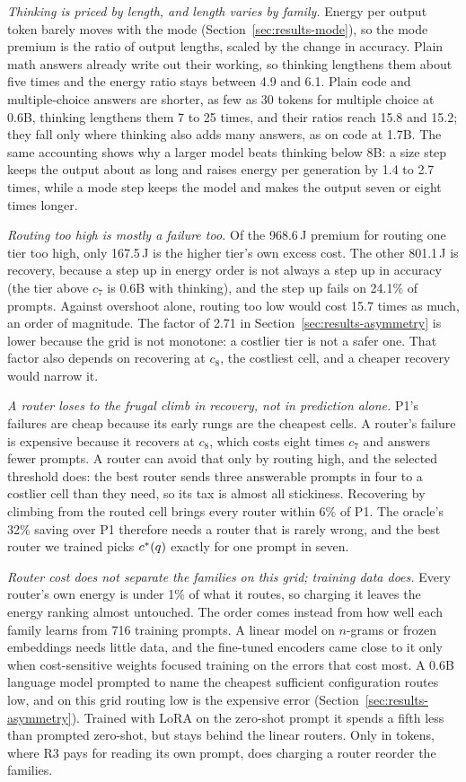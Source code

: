 \emph{Thinking is priced by length, and length varies by family.} Energy per
output token barely moves with the mode (Section~\ref{sec:results-mode}), so
the mode premium is the ratio of output lengths, scaled by the change in
accuracy. Plain math answers already write out their working, so thinking
lengthens them about five times and the energy ratio stays between 4.9 and
6.1. Plain code and multiple-choice answers are shorter, as few as 30 tokens
for multiple choice at 0.6B, thinking lengthens them 7 to 25 times, and
their ratios reach 15.8 and 15.2; they fall only where thinking also adds
many answers, as on code at 1.7B. The same accounting shows why a larger
model beats thinking below 8B: a size step keeps the output about as long
and raises energy per generation by 1.4 to 2.7 times, while a mode step
keeps the model and makes the output seven or eight times longer.

\emph{Routing too high is mostly a failure too.} Of the 968.6\,J premium
for routing one tier too high, only 167.5\,J is the higher tier's own excess
cost. The other 801.1\,J is recovery, because a step up in energy order
is not always a step up in accuracy (the tier above $c_7$ is 0.6B with
thinking), and the step up fails on 24.1\% of prompts. Against overshoot
alone, routing too low would cost 15.7 times as much, an order of
magnitude. The factor of 2.71 in Section~\ref{sec:results-asymmetry} is
lower because the grid is not monotone: a costlier tier is not a safer
one. That factor also depends on recovering at $c_8$, the costliest cell,
and a cheaper recovery would narrow it.

\emph{A router loses to the frugal climb in recovery, not in prediction
alone.} P1's failures are cheap because its early rungs are the cheapest
cells. A router's failure is expensive because it recovers at $c_8$, which
costs eight times $c_7$ and answers fewer prompts. A router can avoid that
only by routing high, and the selected threshold does: the best router sends
three answerable prompts in four to a costlier cell than they need, so its
tax is almost all stickiness. Recovering by climbing from the routed cell
brings every router within 6\% of P1. The oracle's 32\% saving over P1
therefore needs a router that is rarely wrong, and the best router we
trained picks $c^{*}(q)$ exactly for one prompt in seven.

\emph{Router cost does not separate the families on this grid; training data
does.} Every router's own energy is under 1\% of what it routes, so charging
it leaves the energy ranking almost untouched. The order comes instead from
how well each family learns from 716 training prompts. A linear model on
$n$-grams or frozen embeddings needs little data, and the fine-tuned
encoders came close to it only when cost-sensitive weights focused training
on the errors that cost most. A 0.6B language model prompted to name the
cheapest sufficient configuration routes low, and on this grid routing low
is the expensive error (Section~\ref{sec:results-asymmetry}). Trained with
LoRA on the zero-shot prompt it spends a fifth less than prompted zero-shot,
but stays behind the linear routers. Only in tokens, where
R3 pays for reading its own prompt, does charging a router reorder the
families.

